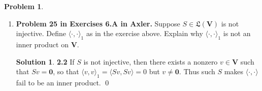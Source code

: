 \documentclass{article}
\theoremstyle{definition}
\newtheorem*{prob*}{Problem}
\newtheorem*{sln*}{Solution}
\newcommand{\V}{\mathbf{V}}
\newcommand{\LL}{\mathfrak{L}}
\newcommand{\la}{\langle}
\newcommand{\ra}{\rangle}
\begin{document}
\begin{prob*}
\begin{enumerate}
		

		
		
		
		\item \textbf{Problem 25 in Exercises 6.A in Axler.} Suppose $S \in \LL(\V)$ is not injective. Define $\la \cdot , \cdot \ra_1$ as in the exercise above. Explain why $\la \cdot, \cdot\ra_1$ is not an inner product on $\V$.
		
		\begin{sln*}\textbf{2.2} 
			If $S$ is not injective, then there exists a nonzero $v\in \V$ such that $Sv = \mathbf{0}$, so that $\la v,v \ra_1 = \la Sv, Sv \ra = 0$ but $v \neq \mathbf{0}$. Thus such $S$ makes $\la \cdot, \cdot \ra$ fail to be an inner product. \qed

		\end{sln*}
		
		
	\end{enumerate}
	
\end{prob*}




\newpage
\end{document}

